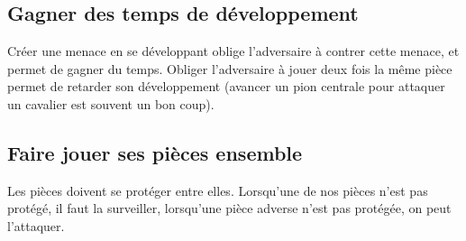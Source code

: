 \subsection{Gagner des temps de développement}
Créer une menace en se développant oblige l'adversaire à contrer cette menace, et permet de gagner du temps.
Obliger l'adversaire à jouer deux fois la même pièce permet de retarder son développement
(avancer un pion centrale pour attaquer un cavalier est souvent un bon coup).


\subsection{Faire jouer ses pièces ensemble}

Les pièces doivent se protéger entre elles. Lorsqu'une de nos pièces n'est pas protégé, il faut la surveiller, lorsqu'une pièce adverse n'est pas protégée, on peut l'attaquer.





